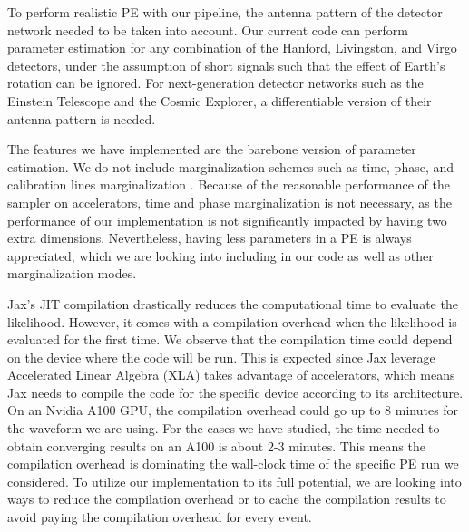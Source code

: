 \documentclass[twocolumn]{aastex631}
\begin{document}

To perform realistic PE with our pipeline, the antenna pattern of the
detector network needed to be taken into account. Our current code can perform
parameter estimation for any combination of the Hanford, Livingston, and Virgo
detectors, under the assumption of short signals such that the effect of Earth's
rotation can be ignored. For next-generation detector networks such as the
Einstein Telescope and the Cosmic Explorer, a differentiable version
of their antenna pattern is needed.

The features we have implemented are the barebone version of parameter
estimation. We do not include marginalization schemes such as time, phase, and
calibration lines marginalization \cite{2019PASA...36...10T}. Because of the reasonable performance of the
sampler on accelerators, time and phase marginalization is not necessary, as the
performance of our implementation is not significantly impacted by having two
extra dimensions. Nevertheless, having less parameters in a PE is always
appreciated, which we are looking into including in our code as well as other
marginalization modes.

Jax's JIT compilation drastically reduces the computational time to evaluate the
likelihood. However, it comes with a compilation overhead when the likelihood is
evaluated for the first time. We observe that the compilation time could depend
on the device where the code will be run. This is expected since Jax leverage
Accelerated Linear Algebra (XLA) takes advantage of accelerators, which means
Jax needs to compile the code for the specific device according to its
architecture. On an Nvidia A100 GPU, the compilation overhead could go up to 8
minutes for the waveform we are using. For the cases we have studied, the time
needed to obtain converging results on an A100 is about 2-3 minutes. This means
the compilation overhead is dominating the wall-clock time of the specific PE
run we considered. To utilize our implementation to its full potential, we are
looking into ways to reduce the compilation overhead or to cache the
compilation results to avoid paying the compilation overhead for every event.

\end{document}
